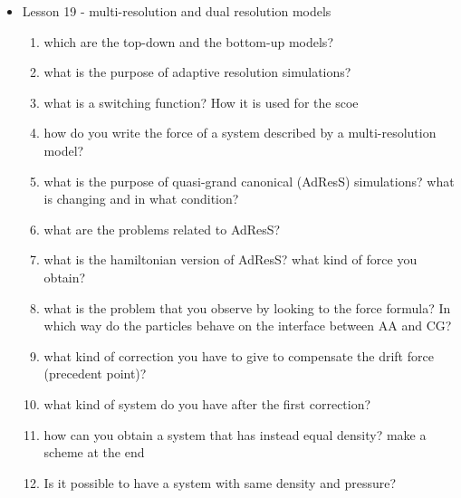 {\begin{itemize}
\begin{enumerate}
        \item how can you intend the position of a knot on a length? what type of ... you expect on the stationary points?
        \item what is interesting about knots in proteins? why you don't expect them?
        \item what characteristics are necessary for self-folding? what type of measures do you adopt as a consequence?
        \item what is an elastic folder model? what is its main role?
        \item what is the process through which you evlaluate the folding rate through the elastic folder model
        \item What type of measure do you adopt to evaluate the folding process?
        \item what is the RMSD?
    \end{enumerate}
    \item Lesson 19 - multi-resolution and dual resolution models
    \begin{enumerate}
        \item which are the top-down and the bottom-up models?
        \item what is the purpose of adaptive resolution simulations?
        \item what is a switching function? How it is used for the scoe
        \item how do you write the force of a system described by a multi-resolution model?
        \item what is the purpose of quasi-grand canonical (AdResS) simulations? what is changing and in what condition?
        \item what are the problems related to AdResS?
        \item what is the hamiltonian version of AdResS? what kind of force you obtain?
        \item what is the problem that you observe by looking to the force formula? In which way do the particles behave on the interface between AA and CG?
        \item what kind of correction you have to give to compensate the drift force (precedent point)?
        \item what kind of system do you have after the first correction?
        \item how can you obtain a system that has instead equal density? make a scheme at the end
        \item Is it possible to have a system with same density and pressure?

\end{enumerate}
\end{itemize}}

